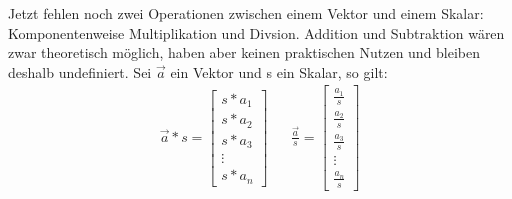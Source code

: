 Jetzt fehlen noch zwei Operationen zwischen einem Vektor und einem Skalar: Komponentenweise Multiplikation und Divsion. Addition und Subtraktion wären zwar theoretisch möglich, haben aber keinen praktischen Nutzen und bleiben deshalb undefiniert. Sei $\vec{a}$ ein Vektor und s ein Skalar, so gilt:
\begin{align}\label{vecscalaraddsub}
\vec{a} * s =
\begin{bmatrix} s*a_1 \\ s*a_2 \\ s*a_3 \\ \vdots \\ s*a_n\end{bmatrix}&&
\frac{\vec{a}}{s} =
\begin{bmatrix} \frac{a_1}{s} \\ \frac{a_2}{s} \\ \frac{a_3}{s} \\ \vdots \\ \frac{a_n}{s} \end{bmatrix}
\end{align}
